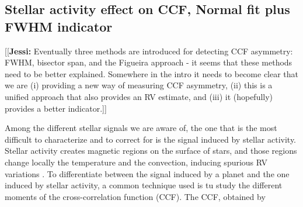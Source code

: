 \documentclass[11pt, oneside]{article}
\newcommand{\jessi}[1]{{\color{Purple}[[\textbf{Jessi: }#1]]}}
\newcommand{\comment}[1]{{\color{red}[[\textbf{Referee: }#1]]}}
\begin{document}
{%
\subsection{Stellar activity effect on CCF, Normal fit plus FWHM indicator}
\jessi{Eventually three methods are introduced for detecting CCF asymmetry:  FWHM, bisector span, and the Figueira approach - it seems that these methods need to be better explained.  Somewhere in the intro it needs to become clear that we are (i) providing a new way of measuring CCF asymmetry, (ii) this is a unified approach that also provides an RV estimate, and (iii) it (hopefully) provides a better indicator.}

Among the different stellar signals we are aware of, the one that is the most difficult to characterize and to correct for is the signal induced by stellar activity. Stellar activity creates magnetic regions on the surface of stars, and those regions change locally the temperature and the convection, inducing spurious RV variations \citep[e.g.][]{Meunier-2010a, Dumusque-2014b}. To differentiate between the signal induced by a planet and the one induced by stellar activity, a common technique used is tu study the different moments of the cross-correlation function (CCF). The CCF, obtained by 



}
\end{document}
